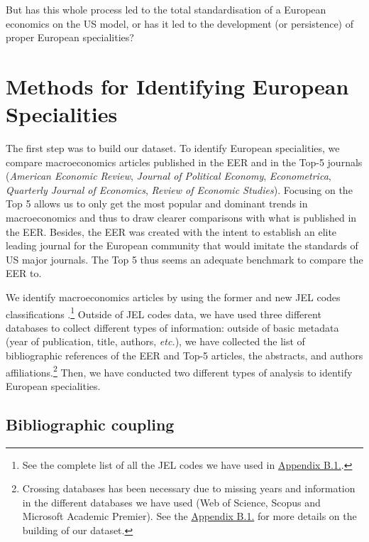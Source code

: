 \documentclass[]{elsarticle} %
\begin{document}
But has this whole process led to the total standardisation of a
European economics on the US model, or has it led to the development (or
persistence) of proper European specialities?

\hypertarget{european-specialities}{%
\section{Methods for Identifying European
Specialities}\label{european-specialities}}

The first step was to build our dataset. To identify European
specialities, we compare macroeconomics articles published in the EER
and in the Top-5 journals (\emph{American Economic Review},
\emph{Journal of Political Economy}, \emph{Econometrica},
\emph{Quarterly Journal of Economics}, \emph{Review of Economic
Studies}). Focusing on the Top 5 allows us to only get the most popular
and dominant trends in macroeconomics and thus to draw clearer
comparisons with what is published in the EER. Besides, the EER was
created with the intent to establish an elite leading journal for the
European community that would imitate the standards of US major
journals. The Top 5 thus seems an adequate benchmark to compare the EER
to.

We identify macroeconomics articles by using the former and new JEL
codes classifications \citep{jel1991}.\footnote{See the complete list of
  all the JEL codes we have used in
  \protect\hyperlink{eer-top5-macro}{Appendix B.1.}.} Outside of JEL
codes data, we have used three different databases to collect different
types of information: outside of basic metadata (year of publication,
title, authors, \emph{etc.}), we have collected the list of
bibliographic references of the EER and Top-5 articles, the abstracts,
and authors affiliations.\footnote{Crossing databases has been necessary
  due to missing years and information in the different databases we
  have used (Web of Science, Scopus and Microsoft Academic Premier). See
  the \protect\hyperlink{corpus}{Appendix B.1.} for more details on the
  building of our dataset.} Then, we have conducted two different types
of analysis to identify European specialities.

\hypertarget{bibliographic-coupling}{%
\subsection{Bibliographic coupling}\label{bibliographic-coupling}}
\end{document}
